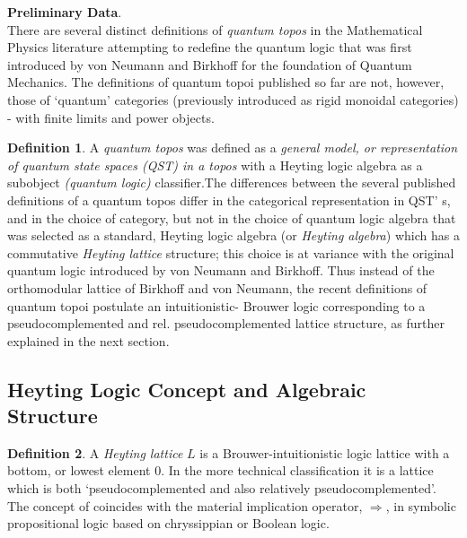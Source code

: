 \documentclass[12pt]{article}
\theoremstyle{plain}
\theoremstyle{definition}
\newtheorem{definition}{Definition}[section]
\numberwithin{equation}{section}
\begin{document}
\textbf{Preliminary Data}. \\
There are several distinct definitions of \emph{quantum topos} in the
Mathematical Physics literature attempting to redefine the quantum logic
that was first introduced by von Neumann and Birkhoff for the foundation
of Quantum Mechanics. The definitions of quantum topoi published so far
are not, however, those of `quantum' categories (previously introduced as rigid monoidal categories) 
- with finite limits and power objects. \\

\begin{definition}
A \emph{quantum topos} was defined as a \emph{general model, or representation of quantum state spaces (QST) 
in a topos} with a  Heyting logic algebra as a subobject \emph{(quantum logic)} classifier.The differences between the several published definitions of a quantum topos differ in the categorical
representation in QST' s, and in the choice of category, but not in the choice of quantum logic algebra
that was selected as a standard, Heyting logic algebra (or \emph{Heyting algebra}) which has a commutative 
\emph{Heyting lattice} structure; this choice is at variance with the original quantum logic introduced by von Neumann and Birkhoff. Thus instead of the orthomodular lattice of Birkhoff and von Neumann, the recent definitions of quantum topoi postulate an intuitionistic- Brouwer logic corresponding to a pseudocomplemented and rel. pseudocomplemented
lattice structure, as further explained in the next section.
\end{definition}


\subsection{Heyting Logic Concept and Algebraic Structure}

\begin{definition}
A \emph{Heyting lattice} $L$ is a Brouwer-intuitionistic logic lattice with a bottom, or lowest element $0$. 
In the more technical classification it is a  lattice which is both `pseudocomplemented and also relatively pseudocomplemented'. The concept of  coincides with the material implication operator, $\Rightarrow$, in symbolic  
propositional logic based on chryssippian or Boolean logic.

\end{definition}
\end{document}
